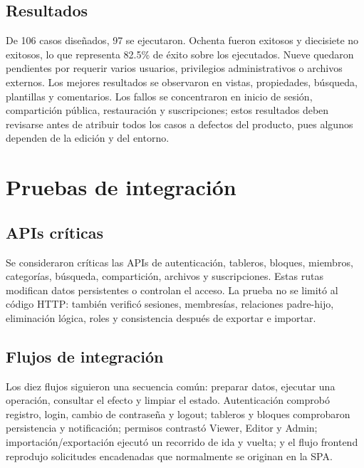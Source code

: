 \documentclass[conference]{IEEEtran}
\begin{document}
\subsection{Resultados}
De 106 casos diseñados, 97 se ejecutaron. Ochenta fueron exitosos y diecisiete no exitosos, lo que representa 82.5\% de éxito sobre los ejecutados. Nueve quedaron pendientes por requerir varios usuarios, privilegios administrativos o archivos externos. Los mejores resultados se observaron en vistas, propiedades, búsqueda, plantillas y comentarios. Los fallos se concentraron en inicio de sesión, compartición pública, restauración y suscripciones; estos resultados deben revisarse antes de atribuir todos los casos a defectos del producto, pues algunos dependen de la edición y del entorno.
\vspace{\baselineskip}

\section{Pruebas de integración}

\subsection{APIs críticas}
Se consideraron críticas las APIs de autenticación, tableros, bloques, miembros, categorías, búsqueda, compartición, archivos y suscripciones. Estas rutas modifican datos persistentes o controlan el acceso. La prueba no se limitó al código HTTP: también verificó sesiones, membresías, relaciones padre-hijo, eliminación lógica, roles y consistencia después de exportar e importar.
\vspace{\baselineskip}

\subsection{Flujos de integración}
Los diez flujos siguieron una secuencia común: preparar datos, ejecutar una operación, consultar el efecto y limpiar el estado. Autenticación comprobó registro, login, cambio de contraseña y logout; tableros y bloques comprobaron persistencia y notificación; permisos contrastó Viewer, Editor y Admin; importación/exportación ejecutó un recorrido de ida y vuelta; y el flujo frontend reprodujo solicitudes encadenadas que normalmente se originan en la SPA.
\end{document}
